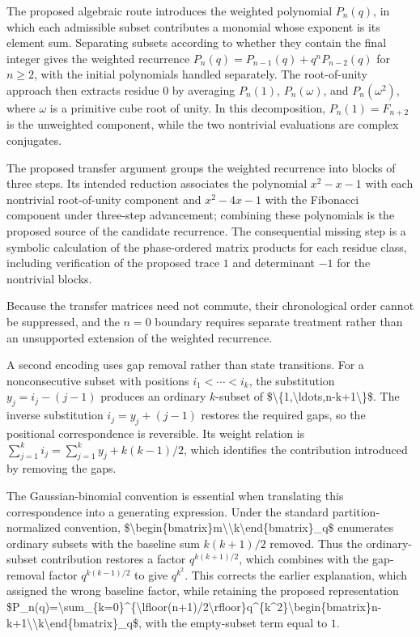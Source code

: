 \documentclass[11pt]{article}
\begin{document}
The proposed algebraic route introduces the weighted polynomial $P_n(q)$, in which each admissible subset contributes a monomial whose exponent is its element sum. Separating subsets according to whether they contain the final integer gives the weighted recurrence $P_n(q)=P_{n-1}(q)+q^nP_{n-2}(q)$ for $n\geq2$, with the initial polynomials handled separately. The root-of-unity approach then extracts residue $0$ by averaging $P_n(1)$, $P_n(\omega)$, and $P_n(\omega^2)$, where $\omega$ is a primitive cube root of unity. In this decomposition, $P_n(1)=F_{n+2}$ is the unweighted component, while the two nontrivial evaluations are complex conjugates.

The proposed transfer argument groups the weighted recurrence into blocks of three steps. Its intended reduction associates the polynomial $x^2-x-1$ with each nontrivial root-of-unity component and $x^2-4x-1$ with the Fibonacci component under three-step advancement; combining these polynomials is the proposed source of the candidate recurrence. The consequential missing step is a symbolic calculation of the phase-ordered matrix products for each residue class, including verification of the proposed trace $1$ and determinant $-1$ for the nontrivial blocks.

Because the transfer matrices need not commute, their chronological order cannot be suppressed, and the $n=0$ boundary requires separate treatment rather than an unsupported extension of the weighted recurrence.

A second encoding uses gap removal rather than state transitions. For a nonconsecutive subset with positions $i_1<\cdots<i_k$, the substitution $y_j=i_j-(j-1)$ produces an ordinary $k$-subset of \$\textbackslash{}\{1,\textbackslash{}ldots,n-k+1\textbackslash{}\}\$. The inverse substitution $i_j=y_j+(j-1)$ restores the required gaps, so the positional correspondence is reversible. Its weight relation is $\sum_{j=1}^k i_j=\sum_{j=1}^k y_j+k(k-1)/2$, which identifies the contribution introduced by removing the gaps.

The Gaussian-binomial convention is essential when translating this correspondence into a generating expression. Under the standard partition-normalized convention, \$\textbackslash{}begin\{bmatrix\}m\textbackslash{}\textbackslash{}k\textbackslash{}end\{bmatrix\}\_q\$ enumerates ordinary subsets with the baseline sum $k(k+1)/2$ removed. Thus the ordinary-subset contribution restores a factor $q^{k(k+1)/2}$, which combines with the gap-removal factor $q^{k(k-1)/2}$ to give $q^{k^2}$. This corrects the earlier explanation, which assigned the wrong baseline factor, while retaining the proposed representation \$P\_n(q)=\textbackslash{}sum\_\{k=0\}\textasciicircum{}\{\textbackslash{}lfloor(n+1)/2\textbackslash{}rfloor\}q\textasciicircum{}\{k\textasciicircum{}2\}\textbackslash{}begin\{bmatrix\}n-k+1\textbackslash{}\textbackslash{}k\textbackslash{}end\{bmatrix\}\_q\$, with the empty-subset term equal to $1$.
\end{document}
